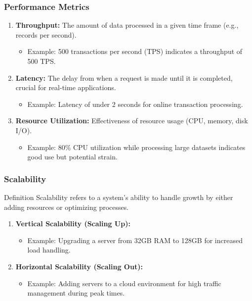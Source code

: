 \documentclass[aspectratio=169]{beamer}
\begin{document}
\begin{frame}
    \frametitle{Performance Metrics}
    \begin{enumerate}
        \item \textbf{Throughput:} The amount of data processed in a given time frame (e.g., records per second).
        \begin{itemize}
            \item Example: 500 transactions per second (TPS) indicates a throughput of 500 TPS.
        \end{itemize}
        
        \item \textbf{Latency:} The delay from when a request is made until it is completed, crucial for real-time applications.
        \begin{itemize}
            \item Example: Latency of under 2 seconds for online transaction processing.
        \end{itemize}
        
        \item \textbf{Resource Utilization:} Effectiveness of resource usage (CPU, memory, disk I/O).
        \begin{itemize}
            \item Example: 80\% CPU utilization while processing large datasets indicates good use but potential strain.
        \end{itemize}
    \end{enumerate}
\end{frame}

\begin{frame}
    \frametitle{Scalability}
    \begin{block}{Definition}
        Scalability refers to a system's ability to handle growth by either adding resources or optimizing processes.
    \end{block}
    \begin{enumerate}
        \item \textbf{Vertical Scalability (Scaling Up):}
        \begin{itemize}
            \item Example: Upgrading a server from 32GB RAM to 128GB for increased load handling.
        \end{itemize}

        \item \textbf{Horizontal Scalability (Scaling Out):}
        \begin{itemize}
            \item Example: Adding servers to a cloud environment for high traffic management during peak times.
        \end{itemize}
    \end{enumerate}
\end{frame}
\end{document}
